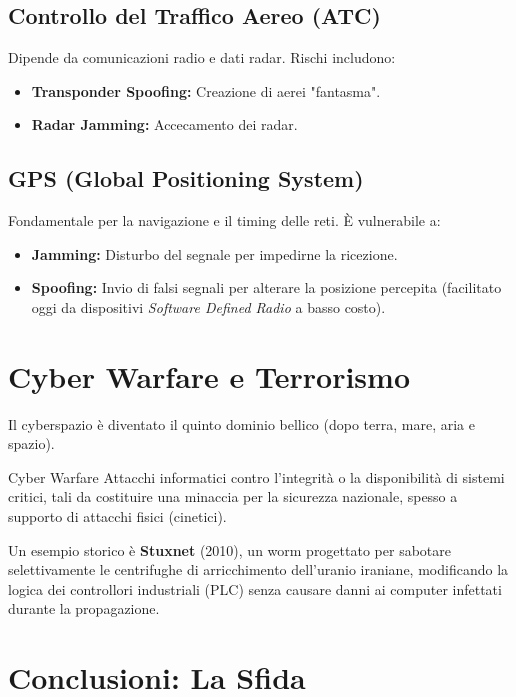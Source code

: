 \documentclass[a4paper,12pt]{article}
\begin{document}
\subsection{Controllo del Traffico Aereo (ATC)}
Dipende da comunicazioni radio e dati radar. Rischi includono:
\begin{itemize}
    \item \textbf{Transponder Spoofing:} Creazione di aerei "fantasma".
    \item \textbf{Radar Jamming:} Accecamento dei radar.
\end{itemize}

\subsection{GPS (Global Positioning System)}
Fondamentale per la navigazione e il timing delle reti. È vulnerabile a:
\begin{itemize}
    \item \textbf{Jamming:} Disturbo del segnale per impedirne la ricezione.
    \item \textbf{Spoofing:} Invio di falsi segnali per alterare la posizione percepita (facilitato oggi da dispositivi \textit{Software Defined Radio} a basso costo).
\end{itemize}

\section{Cyber Warfare e Terrorismo}

Il cyberspazio è diventato il quinto dominio bellico (dopo terra, mare, aria e spazio). 

\begin{definizione}{Cyber Warfare}
Attacchi informatici contro l'integrità o la disponibilità di sistemi critici, tali da costituire una minaccia per la sicurezza nazionale, spesso a supporto di attacchi fisici (cinetici).
\end{definizione}

Un esempio storico è \textbf{Stuxnet} (2010), un worm progettato per sabotare selettivamente le centrifughe di arricchimento dell'uranio iraniane, modificando la logica dei controllori industriali (PLC) senza causare danni ai computer infettati durante la propagazione.

\section{Conclusioni: La Sfida}
\end{document}
